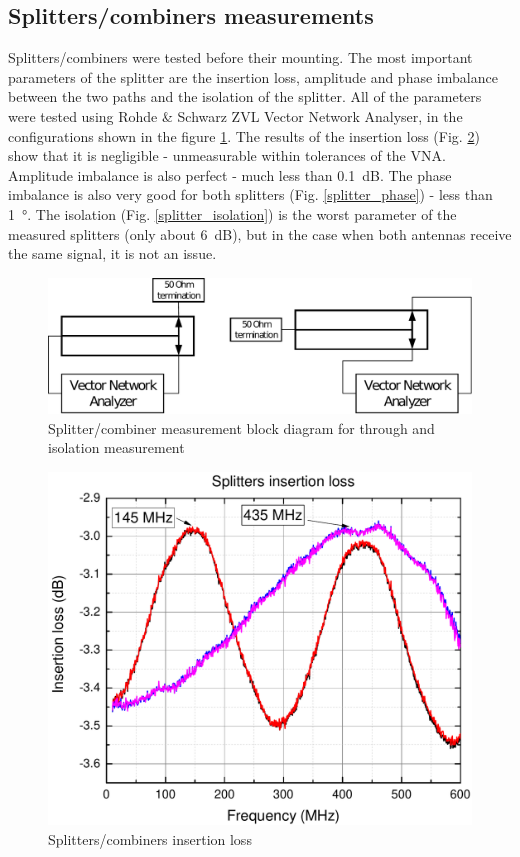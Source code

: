 \subsection{Splitters/combiners measurements}
Splitters/combiners were tested before their mounting. The most important parameters of the splitter are the insertion loss, amplitude and phase imbalance between the two paths and the isolation of the splitter. All of the parameters were tested using Rohde \& Schwarz ZVL Vector Network Analyser, in the configurations shown in the figure \ref{splitter_measurement_diagram}. The results of the insertion loss (Fig. \ref{splitter_amplitude}) show that it is negligible - unmeasurable within tolerances of the VNA. Amplitude imbalance is also perfect - much less than \SI{0.1}{\dB}. The phase imbalance is also very good for both splitters (Fig. \ref{splitter_phase}) - less than \SI{1}{\degree}. The isolation (Fig. \ref{splitter_isolation}) is the worst parameter of the measured splitters (only about \SI{6}{\dB}), but in the case when both antennas receive the same signal, it is not an issue.

\begin{figure}
    \centering
    \includegraphics[width=0.75\paperwidth]{img/7/splitter_measurement_diagram.pdf}
    \caption{Splitter/combiner measurement block diagram for through and isolation measurement}
    \label{splitter_measurement_diagram}
\end{figure}

\begin{figure}
    \centering
    \includegraphics[width=0.6\paperwidth]{img/7/splitter_amplitude.pdf}
    \caption{Splitters/combiners insertion loss}
    \label{splitter_amplitude}
\end{figure}


